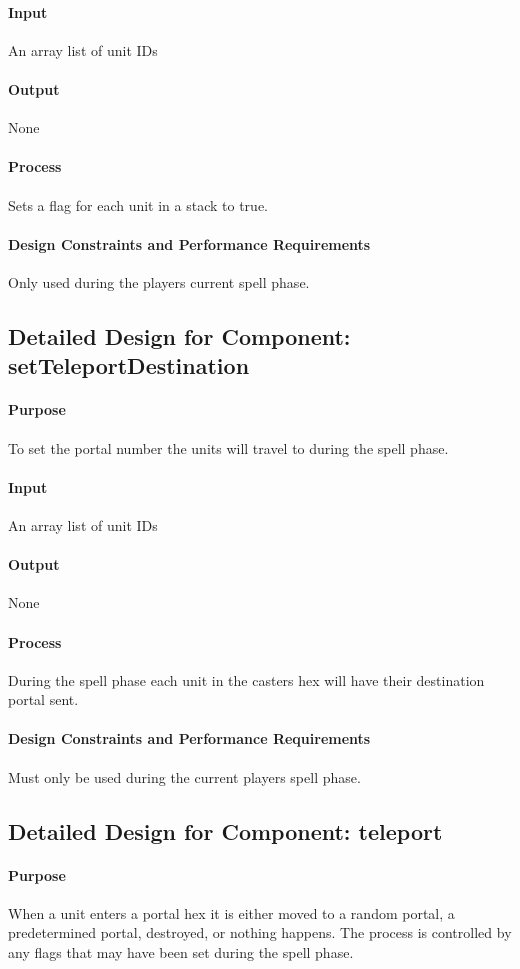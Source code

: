 \documentclass[12pt,a4paper,titlepage]{article}
\begin{document}
\paragraph{Input} An array list of unit IDs
\paragraph{Output} None
\paragraph{Process} Sets a flag for each unit in a stack to true.
\paragraph{Design Constraints and Performance Requirements} Only used during the players current spell phase.

\subsection{Detailed Design for Component: setTeleportDestination}
\paragraph{Purpose} To set the portal number the units will travel to during the spell phase.
\paragraph{Input} An array list of unit IDs
\paragraph{Output} None
\paragraph{Process} During the spell phase each unit in the casters hex will have their destination portal sent.
\paragraph{Design Constraints and Performance Requirements} Must only be used during the current players spell phase.

\subsection{Detailed Design for Component: teleport}
\paragraph{Purpose} When a unit enters a portal hex it is either moved to a random portal, a predetermined portal, destroyed, or nothing happens. The process is controlled by any flags that may have been set during the spell phase.
\end{document}
